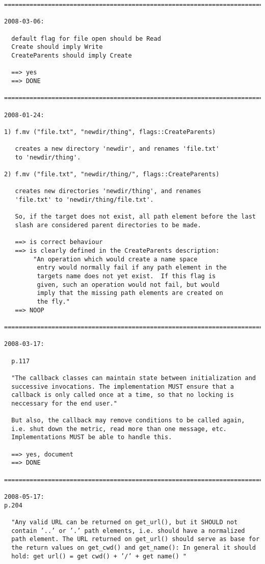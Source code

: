 \documentclass{article}
\begin{document}
\begin{verbatim}
=========================================================================

2008-03-06:

  default flag for file open should be Read
  Create should imply Write
  CreateParents should imply Create

  ==> yes
  ==> DONE

=========================================================================

2008-01-24:

1) f.mv ("file.txt", "newdir/thing", flags::CreateParents)

   creates a new directory 'newdir', and renames 'file.txt'
   to 'newdir/thing'.

2) f.mv ("file.txt", "newdir/thing/", flags::CreateParents)

   creates new directories 'newdir/thing', and renames
   'file.txt' to 'newdir/thing/file.txt'.

   So, if the target does not exist, all path element before the last
   slash are considered parent directories to be made. 

   ==> is correct behaviour
   ==> is clearly defined in the CreateParents description:
        "An operation which would create a name space 
         entry would normally fail if any path element in the
         targets name does not yet exist.  If this flag is
         given, such an operation would not fail, but would
         imply that the missing path elements are created on
         the fly."
   ==> NOOP

=========================================================================

2008-03-17:

  p.117

  "The callback classes can maintain state between initialization and
  successive invocations. The implementation MUST ensure that a
  callback is only called once at a time, so that no locking is
  neccessary for the end user."

  But also, the callback may remove conditions to be called again,
  i.e. shut down the metric, read more than one message, etc.
  Implementations MUST be able to handle this.

  ==> yes, document
  ==> DONE

=========================================================================

2008-05-17:
p.204

  "Any valid URL can be returned on get_url(), but it SHOULD not
  contain ’..’ or ’.’ path elements, i.e. should have a normalized
  path element. The URL returned on get_url() should serve as base for
  the return values on get_cwd() and get_name(): In general it should
  hold: get url() = get cwd() + ’/’ + get name() "


\end{verbatim}
\end{document}
